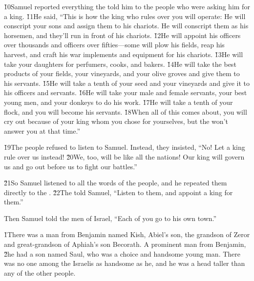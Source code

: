 \v{10}Samuel reported everything the  told him to the people who were asking him for a king. \v{11}He said, ``This is how the king who rules over you will operate: He will conscript your sons and assign them to his chariots. He will conscript them as his horsemen, and they'll run in front of his chariots. \v{12}He will appoint his officers over thousands and officers over fifties---some will plow his fields, reap his harvest, and craft his war implements and equipment for his chariots. \v{13}He will take your daughters for perfumers, cooks, and bakers. \v{14}He will take the best products of your fields, your vineyards, and your olive groves and give them to his servants. \v{15}He will take a tenth of your seed and your vineyards and give it to his officers and servants. \v{16}He will take your male and female servants, your best young men, and your donkeys to do his work. \v{17}He will take a tenth of your flock, and you will become his servants. \v{18}When all of this comes about, you will cry out because of your king whom you chose for yourselves, but the  won't answer you at that time.''

\v{19}The people refused to listen to Samuel. Instead, they insisted, ``No! Let a king rule over us instead! \v{20}We, too, will be like all the nations! Our king will govern us and go out before us to fight our battles.''

\v{21}So Samuel listened to all the words of the people, and he repeated them directly to the . \v{22}The  told Samuel, ``Listen to them, and appoint a king for them.''

Then Samuel told the men of Israel, ``Each of you go to his own town.''

\v{1}There was a man from Benjamin named Kish, Abiel's son, the grandson of Zeror and great-grandson of Aphiah's son Becorath. A prominent man from Benjamin, \v{2}he had a son named Saul, who was a choice and handsome young man. There was no one among the Israelis as handsome as he, and he was a head taller than any of the other people.


